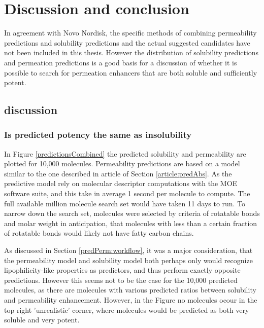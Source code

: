 \chapter{Discussion and conclusion}

In agreement with Novo Nordisk, the specific methods of combining permeability predictions and solubility predictions and the actual suggested candidates have not been included in this thesis. However the distribution of solubility predictions and permeation predictions is a good basis for a discussion of whether it is possible to search for permeation enhancers that are both soluble and sufficiently potent.

\section{discussion}

\subsection{Is predicted potency the same as insolubility}
In Figure \ref{predictionsCombined} the predicted solubility and permeability are plotted for 10,000 molecules. Permeability predictions are based on a model similar to the one described in article of Section \ref{article:predAbs}. As the predictive model rely on molecular descriptor computations with the MOE software suite, and this take in average 1 second per molecule to compute. The full available million molecule search set would have taken 11 days to run. To narrow down the search set, molecules were selected by criteria of rotatable bonds and molar weight in anticipation, that molecules with less than a certain fraction of rotatable bonds would likely not have fatty carbon chains.

As discussed in Section \ref{predPerm:workflow}, it was a major consideration, that the permeability model and solubility model both perhaps only would recognize lipophilicity-like properties as predictors, and thus perform exactly opposite predictions. However this seems not to be the case for the 10,000 predicted molecules, as there are molecules with various predicted ratios between solubility and permeability enhancement. However, in the Figure no molecules ocour in the top right 'unrealistic' corner, where molecules would be predicted as both very soluble and very potent.


